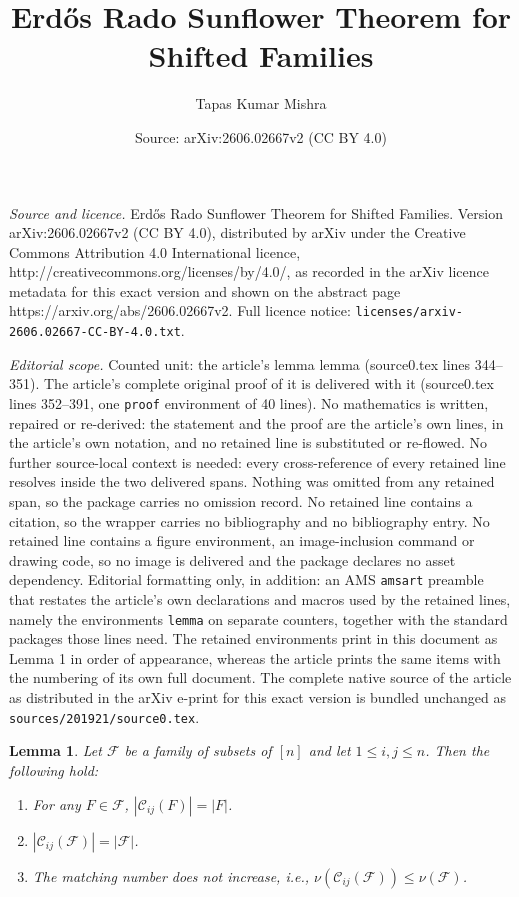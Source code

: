 \documentclass[10pt,a4paper]{amsart}
\title{Erd\H{o}s Rado Sunflower Theorem for Shifted Families}
\author{Tapas Kumar Mishra}
\date{Source: arXiv:2606.02667v2 (CC BY 4.0)}
\newtheorem{lemma}{Lemma}
\begin{document}
\maketitle

\noindent\emph{Source and licence.} Erd\H{o}s Rado Sunflower Theorem for Shifted Families. Version arXiv:2606.02667v2 (CC BY 4.0), distributed by arXiv under the Creative Commons Attribution 4.0 International licence, http://creativecommons.org/licenses/by/4.0/, as recorded in the arXiv licence metadata for this exact version and shown on the abstract page https://arxiv.org/abs/2606.02667v2. Full licence notice: \texttt{licenses/arxiv-2606.02667-CC-BY-4.0.txt}.\par\smallskip

\noindent\textit{Editorial scope.} Counted unit: the article's lemma lemma (source0.tex lines 344--351). The article's complete original proof of it is delivered with it (source0.tex lines 352--391, one \texttt{proof} environment of 40 lines). No mathematics is written, repaired or re-derived: the statement and the proof are the article's own lines, in the article's own notation, and no retained line is substituted or re-flowed.  No further source-local context is needed: every cross-reference of every retained line resolves inside the two delivered spans.  Nothing was omitted from any retained span, so the package carries no omission record.  No retained line contains a citation, so the wrapper carries no bibliography and no bibliography entry.  No retained line contains a figure environment, an image-inclusion command or drawing code, so no image is delivered and the package declares no asset dependency.  Editorial formatting only, in addition: an AMS \texttt{amsart} preamble that restates the article's own declarations and macros used by the retained lines, namely the environments \texttt{lemma} on separate counters, together with the standard packages those lines need.  The retained environments print in this document as Lemma 1 in order of appearance, whereas the article prints the same items with the numbering of its own full document.  The complete native source of the article as distributed in the arXiv e-print for this exact version is bundled unchanged as \texttt{sources/201921/source0.tex}.
\begin{lemma}
	Let $\mathcal{F}$ be a family of subsets of $[n]$ and let $1 \leq i, j \leq n$. Then the following hold:
	\begin{enumerate}[label=(\roman*)]
		\item For any $F \in \mathcal{F}$, $|\mathcal{C}_{ij}(F)| = |F|$.
		\item $|\mathcal{C}_{ij}(\mathcal{F})| = |\mathcal{F}|$.
		\item The matching number does not increase, i.e., $\nu(\mathcal{C}_{ij}(\mathcal{F})) \leq \nu(\mathcal{F})$.
	\end{enumerate}
\end{lemma}
\end{document}
